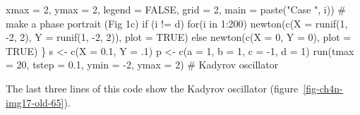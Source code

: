 \documentclass[
  a4paper,
  DIV=11,
  numbers=noendperiod,
  oneside]{scrreprt}
\newenvironment{Shaded}{}{}
\newcommand{\AttributeTok}[1]{\textcolor[rgb]{0.84,0.23,0.29}{#1}}
\newcommand{\CommentTok}[1]{\textcolor[rgb]{0.42,0.45,0.49}{#1}}
\newcommand{\ConstantTok}[1]{\textcolor[rgb]{0.00,0.36,0.77}{#1}}
\newcommand{\ControlFlowTok}[1]{\textcolor[rgb]{0.84,0.23,0.29}{#1}}
\newcommand{\DecValTok}[1]{\textcolor[rgb]{0.00,0.36,0.77}{#1}}
\newcommand{\FloatTok}[1]{\textcolor[rgb]{0.00,0.36,0.77}{#1}}
\newcommand{\FunctionTok}[1]{\textcolor[rgb]{0.44,0.26,0.76}{#1}}
\newcommand{\NormalTok}[1]{\textcolor[rgb]{0.14,0.16,0.18}{#1}}
\newcommand{\OtherTok}[1]{\textcolor[rgb]{0.44,0.26,0.76}{#1}}
\newcommand{\SpecialCharTok}[1]{\textcolor[rgb]{0.00,0.36,0.77}{#1}}
\newcommand{\StringTok}[1]{\textcolor[rgb]{0.01,0.18,0.38}{#1}}
\begin{document}
\begin{Shaded}
\begin{Highlighting}[]
        \AttributeTok{xmax =} \DecValTok{2}\NormalTok{, }\AttributeTok{ymax =} \DecValTok{2}\NormalTok{, }\AttributeTok{legend =} \ConstantTok{FALSE}\NormalTok{, }\AttributeTok{grid =} \DecValTok{2}\NormalTok{,}
        \AttributeTok{main =} \FunctionTok{paste}\NormalTok{(}\StringTok{"Case "}\NormalTok{, i)) }\CommentTok{\# make a phase portrait (Fig 1c)}
  \ControlFlowTok{if}\NormalTok{ (i }\SpecialCharTok{!=} \StringTok{\textquotesingle{}d\textquotesingle{}}\NormalTok{) }\ControlFlowTok{for}\NormalTok{(i }\ControlFlowTok{in} \DecValTok{1}\SpecialCharTok{:}\DecValTok{200}\NormalTok{) }
    \FunctionTok{newton}\NormalTok{(}\FunctionTok{c}\NormalTok{(}\AttributeTok{X =} \FunctionTok{runif}\NormalTok{(}\DecValTok{1}\NormalTok{, }\SpecialCharTok{{-}}\DecValTok{2}\NormalTok{, }\DecValTok{2}\NormalTok{), }
             \AttributeTok{Y =} \FunctionTok{runif}\NormalTok{(}\DecValTok{1}\NormalTok{, }\SpecialCharTok{{-}}\DecValTok{2}\NormalTok{, }\DecValTok{2}\NormalTok{)), }\AttributeTok{plot =} \ConstantTok{TRUE}\NormalTok{) }
  \ControlFlowTok{else} \FunctionTok{newton}\NormalTok{(}\FunctionTok{c}\NormalTok{(}\AttributeTok{X =} \DecValTok{0}\NormalTok{, }\AttributeTok{Y =} \DecValTok{0}\NormalTok{), }\AttributeTok{plot =} \ConstantTok{TRUE}\NormalTok{)}
\NormalTok{\}}
\NormalTok{s }\OtherTok{\textless{}{-}} \FunctionTok{c}\NormalTok{(}\AttributeTok{X =} \FloatTok{0.1}\NormalTok{, }\AttributeTok{Y =}\NormalTok{ .}\DecValTok{1}\NormalTok{) }
\NormalTok{p }\OtherTok{\textless{}{-}} \FunctionTok{c}\NormalTok{(}\AttributeTok{a =} \DecValTok{1}\NormalTok{, }\AttributeTok{b =} \DecValTok{1}\NormalTok{, }\AttributeTok{c =} \SpecialCharTok{{-}}\DecValTok{1}\NormalTok{, }\AttributeTok{d =} \DecValTok{1}\NormalTok{)}
\FunctionTok{run}\NormalTok{(}\AttributeTok{tmax =} \DecValTok{20}\NormalTok{, }\AttributeTok{tstep =} \FloatTok{0.1}\NormalTok{, }\AttributeTok{ymin =} \SpecialCharTok{{-}}\DecValTok{2}\NormalTok{, }\AttributeTok{ymax =} \DecValTok{2}\NormalTok{) }\CommentTok{\# Kadyrov oscillator}
\end{Highlighting}
\end{Shaded}

The last three lines of this code show the Kadyrov oscillator
(figure~\ref{fig-ch4n-img17-old-65}).
\end{document}
